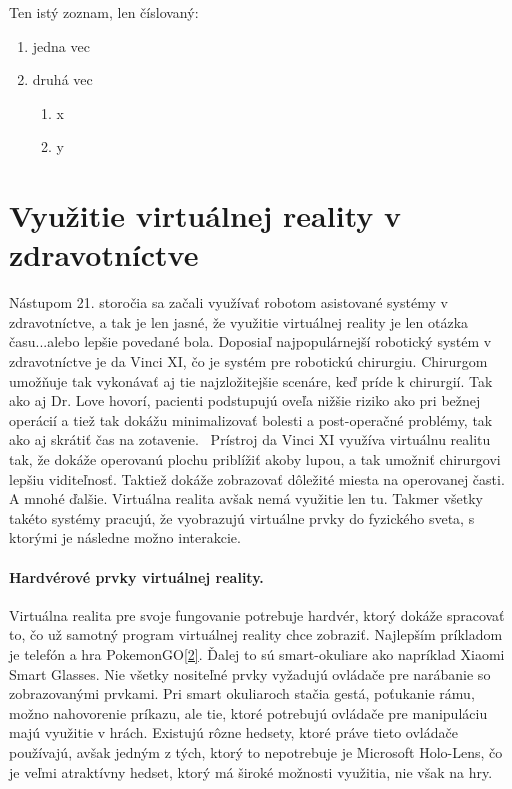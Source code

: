 \documentclass[10pt,twoside,a4paper]{article}
\begin{document}
Ten istý zoznam, len číslovaný:

\begin{enumerate}
\item jedna vec
\item druhá vec
	\begin{enumerate}
	\item x
	\item y
	\end{enumerate}
\end{enumerate}


\section{Využitie virtuálnej reality v zdravotníctve} \label{zdravotnictvo}
Nástupom 21. storočia sa začali využívať robotom asistované systémy v zdravotníctve, a tak je len jasné, že využitie virtuálnej reality je len otázka času...alebo lepšie povedané bola. Doposiaľ najpopulárnejší robotický systém v zdravotníctve je da Vinci XI, čo je systém pre robotickú chirurgiu. Chirurgom umožňuje tak vykonávať aj tie najzložitejšie scenáre, keď príde k chirurgií. Tak ako aj Dr. Love hovorí, pacienti podstupujú oveľa nižšie riziko ako pri bežnej operácií a tiež tak dokážu minimalizovať bolesti a post-operačné problémy, tak ako aj skrátiť čas na zotavenie.~\cite{XiRobots}
Prístroj da Vinci XI využíva virtuálnu realitu tak, že dokáže operovanú plochu priblížiť akoby lupou, a tak umožniť chirurgovi lepšiu viditeľnosť. Taktiež dokáže zobrazovať dôležité miesta na operovanej časti. A mnohé ďalšie. Virtuálna realita avšak nemá využitie len tu. Takmer všetky takéto systémy pracujú, že vyobrazujú virtuálne prvky do fyzického sveta, s ktorými je následne možno interakcie. 

\paragraph{Hardvérové prvky virtuálnej reality.}
Virtuálna realita pre svoje fungovanie potrebuje hardvér, ktorý dokáže spracovať to, čo už samotný program virtuálnej reality chce zobraziť. Najlepším príkladom je telefón a hra PokemonGO\ref{2}. Ďalej to sú smart-okuliare ako napríklad Xiaomi Smart Glasses. Nie všetky nositeľné prvky vyžadujú ovládače pre narábanie so zobrazovanými prvkami. Pri smart okuliaroch stačia gestá, poťukanie rámu, možno nahovorenie príkazu, ale tie, ktoré potrebujú ovládače pre manipuláciu majú využitie v hrách. Existujú rôzne hedsety, ktoré práve tieto ovládače používajú, avšak jedným z tých, ktorý to nepotrebuje je Microsoft Holo-Lens, čo je veľmi atraktívny hedset, ktorý má široké možnosti využitia, nie však na hry.
\end{document}
